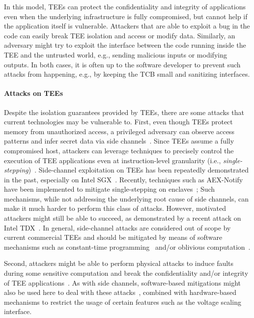 In this model, \acp{TEE} can protect the confidentiality and integrity of
applications even when the underlying infrastructure is fully compromised, but
cannot help if the application itself is vulnerable. Attackers that are able to
exploit a bug in the code can easily break \ac{TEE} isolation and access or
modify data. Similarly, an adversary might try to exploit the interface between
the code running inside the \ac{TEE} and the untrusted world, e.g., sending
malicious inputs or modifying outputs. In both cases, it is often up to the
software developer to prevent such attacks from happening, e.g., by keeping the
\ac{TCB} small and sanitizing interfaces.

\paragraph{Attacks on TEEs}

Despite the isolation guarantees provided by \acp{TEE}, there are some attacks
that current technologies may be vulnerable to. First, even though \acp{TEE}
protect memory from unauthorized access, a privileged adversary can observe
access patterns and infer secret data via side
channels~\cite{lou2021survey,canella2019systematic,shen2021sidechannelsok}.
Since \acp{TEE} assume a fully compromised host, attackers can leverage
techniques to precisely control the execution of \ac{TEE} applications even at
instruction-level granularity (i.e.,
\emph{single-stepping})~\cite{controlled-channel-attacks,jo2017sgxstep,wilke2024sevstep}.
Side-channel exploitation on \acp{TEE} has been repeatedly demonstrated in the
past, especially on Intel \ac{SGX}~\cite{schaik2024sgxsok}. Recently, techniques
such as AEX-Notify have been implemented to mitigate single-stepping on
enclaves~\cite{constable2023aexnotify}; Such mechanisms, while not addressing
the underlying root cause of side channels, can make it much harder to perform
this class of attacks. However, motivated attackers might still be able to
succeed, as demonstrated by a recent attack on Intel
\ac{TDX}~\cite{tdxdownCCS24}. In general, side-channel attacks are considered
out of scope by current commercial \acp{TEE} and should be mitigated by means of
software mechanisms such as constant-time
programming~\cite{cauligi2020constanttime} and/or oblivious
computation~\cite{alam2023oblivioussok,sasy2017zerotrace}.

Second, attackers might be able to perform physical attacks to induce faults
during some sensitive computation and break the confidentiality and/or integrity
of \ac{TEE}
applications~\cite{murdock2020plundervolt,chen2021voltpillager,lipp2021platypus}.
As with side channels, software-based mitigations might also be used here to
deal with these attacks~\cite{wichelmann2024obelix}, combined with
hardware-based mechanisms to restrict the usage of certain features such as the
voltage scaling interface.

